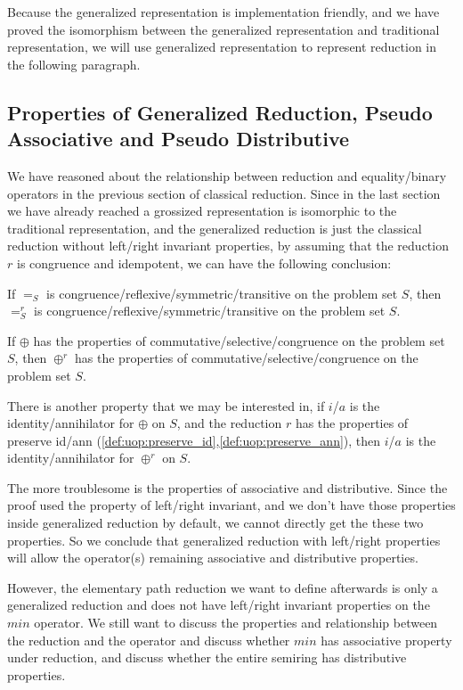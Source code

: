 \documentclass[a4paper,12pt,twoside,openright]{report}
\begin{document}
Because the generalized representation is implementation friendly, and we have proved the isomorphism between the generalized representation and traditional representation, we will use generalized representation to represent reduction in the following paragraph.

\subsection{Properties of Generalized Reduction, Pseudo Associative and Pseudo Distributive}
We have reasoned about the relationship between reduction and equality/binary operators in the previous section of classical reduction. 
Since in the last section we have already reached a grossized representation is isomorphic to the traditional representation, and the generalized reduction is just the classical reduction without left/right invariant properties, by assuming that the reduction $r$ is congruence and idempotent, we can have the following conclusion:

If $=_S$ is congruence/reflexive/symmetric/transitive on the problem set $S$, then $=^r_S$ is congruence/reflexive/symmetric/transitive on the problem set $S$.

If $\oplus$ has the properties of commutative/selective/congruence on the problem set $S$, then $\oplus^r$ has the properties of commutative/selective/congruence on the problem set $S$.

There is another property that we may be interested in, if $i$/$a$ is the identity/annihilator for $\oplus$ on $S$, and the reduction $r$ has the properties of preserve id/ann (\ref{def:uop:preserve_id},\ref{def:uop:preserve_ann}), then $i$/$a$ is the identity/annihilator for $\oplus^r$ on $S$.

The more troublesome is the properties of associative and distributive. Since the proof used the property of left/right invariant, and we don't have those properties inside generalized reduction by default, we cannot directly get the these two properties. So we conclude that generalized reduction with left/right properties will allow the operator(s) remaining associative and distributive properties.

However, the elementary path reduction we want to define afterwards is only a generalized reduction and does not have left/right invariant properties on the $min$ operator. We still want to discuss the properties and relationship between the reduction and the operator and discuss whether $min$ has associative property under reduction, and discuss whether the entire semiring has distributive properties.
\end{document}
